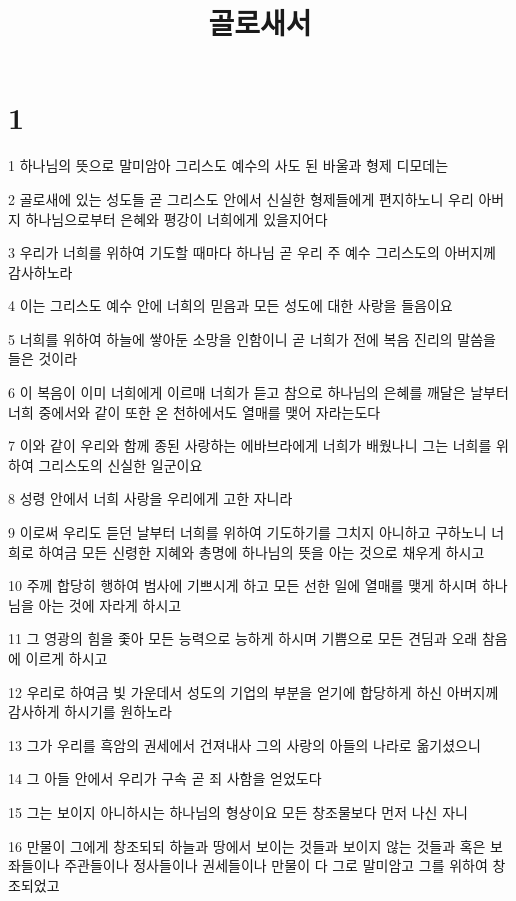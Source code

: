 

\title{골로새서}


\chapter{1}

\par 1 하나님의 뜻으로 말미암아 그리스도 예수의 사도 된 바울과 형제 디모데는
\par 2 골로새에 있는 성도들 곧 그리스도 안에서 신실한 형제들에게 편지하노니 우리 아버지 하나님으로부터 은혜와 평강이 너희에게 있을지어다
\par 3 우리가 너희를 위하여 기도할 때마다 하나님 곧 우리 주 예수 그리스도의 아버지께 감사하노라
\par 4 이는 그리스도 예수 안에 너희의 믿음과 모든 성도에 대한 사랑을 들음이요
\par 5 너희를 위하여 하늘에 쌓아둔 소망을 인함이니 곧 너희가 전에 복음 진리의 말씀을 들은 것이라
\par 6 이 복음이 이미 너희에게 이르매 너희가 듣고 참으로 하나님의 은혜를 깨달은 날부터 너희 중에서와 같이 또한 온 천하에서도 열매를 맺어 자라는도다
\par 7 이와 같이 우리와 함께 종된 사랑하는 에바브라에게 너희가 배웠나니 그는 너희를 위하여 그리스도의 신실한 일군이요
\par 8 성령 안에서 너희 사랑을 우리에게 고한 자니라
\par 9 이로써 우리도 듣던 날부터 너희를 위하여 기도하기를 그치지 아니하고 구하노니 너희로 하여금 모든 신령한 지혜와 총명에 하나님의 뜻을 아는 것으로 채우게 하시고
\par 10 주께 합당히 행하여 범사에 기쁘시게 하고 모든 선한 일에 열매를 맺게 하시며 하나님을 아는 것에 자라게 하시고
\par 11 그 영광의 힘을 좇아 모든 능력으로 능하게 하시며 기쁨으로 모든 견딤과 오래 참음에 이르게 하시고
\par 12 우리로 하여금 빛 가운데서 성도의 기업의 부분을 얻기에 합당하게 하신 아버지께 감사하게 하시기를 원하노라
\par 13 그가 우리를 흑암의 권세에서 건져내사 그의 사랑의 아들의 나라로 옮기셨으니
\par 14 그 아들 안에서 우리가 구속 곧 죄 사함을 얻었도다
\par 15 그는 보이지 아니하시는 하나님의 형상이요 모든 창조물보다 먼저 나신 자니
\par 16 만물이 그에게 창조되되 하늘과 땅에서 보이는 것들과 보이지 않는 것들과 혹은 보좌들이나 주관들이나 정사들이나 권세들이나 만물이 다 그로 말미암고 그를 위하여 창조되었고
